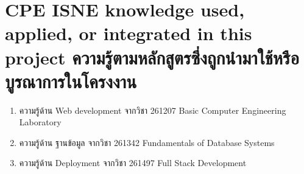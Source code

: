 





\section{\ifenglish%
\ifcpe CPE \else ISNE \fi knowledge used, applied, or integrated in this project
\else%
ความรู้ตามหลักสูตรซึ่งถูกนำมาใช้หรือบูรณาการในโครงงาน
\fi
}

\begin{enumerate}
  \item ความรู้ด้าน Web development จากวิชา 261207 Basic Computer Engineering Laboratory
  \item ความรู้ด้าน ฐานข้อมูล จากวิชา 261342 Fundamentals of Database Systems
  \item ความรู้ด้าน Deployment จากวิชา 261497 Full Stack Development
\end{enumerate}

